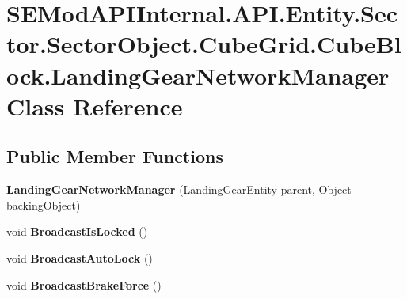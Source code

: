 \hypertarget{class_s_e_mod_a_p_i_internal_1_1_a_p_i_1_1_entity_1_1_sector_1_1_sector_object_1_1_cube_grid_1_154fcaee477cbc43ff04e45ff5a3afe74}{}\section{S\+E\+Mod\+A\+P\+I\+Internal.\+A\+P\+I.\+Entity.\+Sector.\+Sector\+Object.\+Cube\+Grid.\+Cube\+Block.\+Landing\+Gear\+Network\+Manager Class Reference}
\label{class_s_e_mod_a_p_i_internal_1_1_a_p_i_1_1_entity_1_1_sector_1_1_sector_object_1_1_cube_grid_1_154fcaee477cbc43ff04e45ff5a3afe74}
\subsection*{Public Member Functions}
\begin{DoxyCompactItemize}
\item 
\hypertarget{class_s_e_mod_a_p_i_internal_1_1_a_p_i_1_1_entity_1_1_sector_1_1_sector_object_1_1_cube_grid_1_154fcaee477cbc43ff04e45ff5a3afe74_a4289f5e976aa553eb7f62810d72f1474}{}{\bfseries Landing\+Gear\+Network\+Manager} (\hyperlink{class_s_e_mod_a_p_i_internal_1_1_a_p_i_1_1_entity_1_1_sector_1_1_sector_object_1_1_cube_grid_1_102e4670a1e074b947ebe3418c499e61c}{Landing\+Gear\+Entity} parent, Object backing\+Object)\label{class_s_e_mod_a_p_i_internal_1_1_a_p_i_1_1_entity_1_1_sector_1_1_sector_object_1_1_cube_grid_1_154fcaee477cbc43ff04e45ff5a3afe74_a4289f5e976aa553eb7f62810d72f1474}

\item 
\hypertarget{class_s_e_mod_a_p_i_internal_1_1_a_p_i_1_1_entity_1_1_sector_1_1_sector_object_1_1_cube_grid_1_154fcaee477cbc43ff04e45ff5a3afe74_a5b34ae23cb13c4e473d15c7464b569e2}{}void {\bfseries Broadcast\+Is\+Locked} ()\label{class_s_e_mod_a_p_i_internal_1_1_a_p_i_1_1_entity_1_1_sector_1_1_sector_object_1_1_cube_grid_1_154fcaee477cbc43ff04e45ff5a3afe74_a5b34ae23cb13c4e473d15c7464b569e2}

\item 
\hypertarget{class_s_e_mod_a_p_i_internal_1_1_a_p_i_1_1_entity_1_1_sector_1_1_sector_object_1_1_cube_grid_1_154fcaee477cbc43ff04e45ff5a3afe74_ab30ce1941afb2f7369bb30471282e69a}{}void {\bfseries Broadcast\+Auto\+Lock} ()\label{class_s_e_mod_a_p_i_internal_1_1_a_p_i_1_1_entity_1_1_sector_1_1_sector_object_1_1_cube_grid_1_154fcaee477cbc43ff04e45ff5a3afe74_ab30ce1941afb2f7369bb30471282e69a}

\item 
\hypertarget{class_s_e_mod_a_p_i_internal_1_1_a_p_i_1_1_entity_1_1_sector_1_1_sector_object_1_1_cube_grid_1_154fcaee477cbc43ff04e45ff5a3afe74_a555eec31373927fad8af91e64ca51d6a}{}void {\bfseries Broadcast\+Brake\+Force} ()\label{class_s_e_mod_a_p_i_internal_1_1_a_p_i_1_1_entity_1_1_sector_1_1_sector_object_1_1_cube_grid_1_154fcaee477cbc43ff04e45ff5a3afe74_a555eec31373927fad8af91e64ca51d6a}

\end{DoxyCompactItemize}
